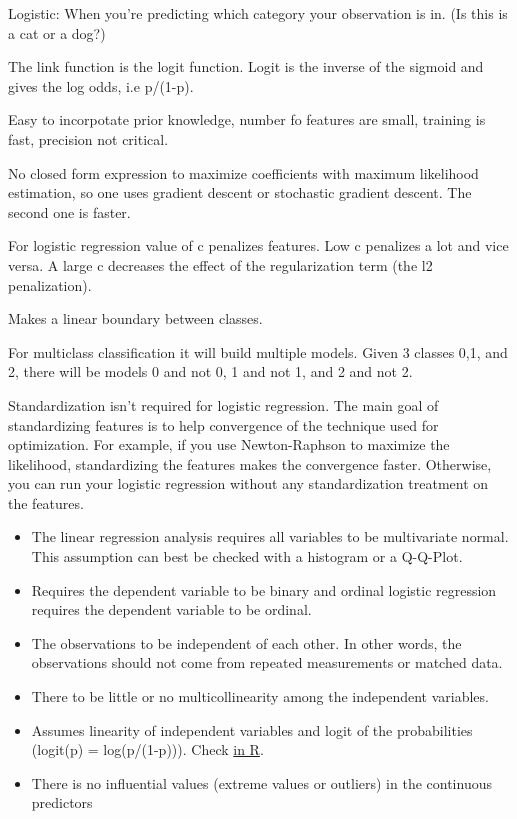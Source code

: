 \documentclass[]{book}
\begin{document}
Logistic: When you're predicting which category your observation is in.
(Is this is a cat or a dog?)

The link function is the logit function. Logit is the inverse of the
sigmoid and gives the log odds, i.e p/(1-p).

Easy to incorpotate prior knowledge, number fo features are small,
training is fast, precision not critical.

No closed form expression to maximize coefficients with maximum
likelihood estimation, so one uses gradient descent or stochastic
gradient descent. The second one is faster.

For logistic regression value of c penalizes features. Low c penalizes a
lot and vice versa. A large c decreases the effect of the regularization
term (the l2 penalization).

Makes a linear boundary between classes.

For multiclass classification it will build multiple models. Given 3
classes 0,1, and 2, there will be models 0 and not 0, 1 and not 1, and 2
and not 2.

Standardization isn't required for logistic regression. The main goal of
standardizing features is to help convergence of the technique used for
optimization. For example, if you use Newton-Raphson to maximize the
likelihood, standardizing the features makes the convergence faster.
Otherwise, you can run your logistic regression without any
standardization treatment on the features.

\begin{itemize}
\item
  The linear regression analysis requires all variables to be
  multivariate normal. This assumption can best be checked with a
  histogram or a Q-Q-Plot.
\item
  Requires the dependent variable to be binary and ordinal logistic
  regression requires the dependent variable to be ordinal.
\item
  The observations to be independent of each other. In other words, the
  observations should not come from repeated measurements or matched
  data.
\item
  There to be little or no multicollinearity among the independent
  variables.
\item
  Assumes linearity of independent variables and logit of the
  probabilities (logit(p) = log(p/(1-p))). Check
  \href{https://stats.stackexchange.com/questions/169348/how-should-i-check-the-assumption-of-linearity-to-the-logit-for-the-continuous-i}{in
  R}.
\item
  There is no influential values (extreme values or outliers) in the
  continuous predictors
\end{itemize}
\end{document}

